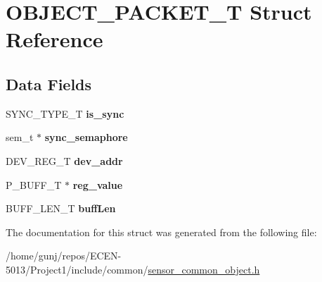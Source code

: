 \hypertarget{structOBJECT__PACKET__T}{}\section{O\+B\+J\+E\+C\+T\+\_\+\+P\+A\+C\+K\+E\+T\+\_\+T Struct Reference}
\label{structOBJECT__PACKET__T}
\subsection*{Data Fields}
\begin{DoxyCompactItemize}
\item 
S\+Y\+N\+C\+\_\+\+T\+Y\+P\+E\+\_\+T {\bfseries is\+\_\+sync}\hypertarget{structOBJECT__PACKET__T_a1648380d5d2dd74ec2e13957949e505e}{}\label{structOBJECT__PACKET__T_a1648380d5d2dd74ec2e13957949e505e}

\item 
sem\+\_\+t $\ast$ {\bfseries sync\+\_\+semaphore}\hypertarget{structOBJECT__PACKET__T_a13b703828ad6478fbffdb99e3c24941c}{}\label{structOBJECT__PACKET__T_a13b703828ad6478fbffdb99e3c24941c}

\item 
D\+E\+V\+\_\+\+R\+E\+G\+\_\+T {\bfseries dev\+\_\+addr}\hypertarget{structOBJECT__PACKET__T_a7b42c85d01c47b432bbd8a86d80b1881}{}\label{structOBJECT__PACKET__T_a7b42c85d01c47b432bbd8a86d80b1881}

\item 
P\+\_\+\+B\+U\+F\+F\+\_\+T $\ast$ {\bfseries reg\+\_\+value}\hypertarget{structOBJECT__PACKET__T_a927d74894329c73aa0a192f110d47671}{}\label{structOBJECT__PACKET__T_a927d74894329c73aa0a192f110d47671}

\item 
B\+U\+F\+F\+\_\+\+L\+E\+N\+\_\+T {\bfseries buff\+Len}\hypertarget{structOBJECT__PACKET__T_a1f397ae898402a439fc093c5347459ae}{}\label{structOBJECT__PACKET__T_a1f397ae898402a439fc093c5347459ae}

\end{DoxyCompactItemize}


The documentation for this struct was generated from the following file\+:\begin{DoxyCompactItemize}
\item 
/home/gunj/repos/\+E\+C\+E\+N-\/5013/\+Project1/include/common/\hyperlink{sensor__common__object_8h}{sensor\+\_\+common\+\_\+object.\+h}\end{DoxyCompactItemize}
